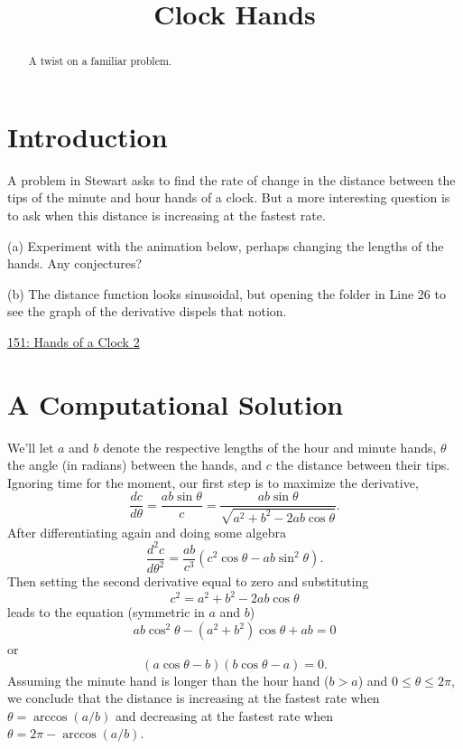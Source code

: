 \documentclass{ximera}
\title{Clock Hands}
\begin{document}
\begin{abstract}
A twist on a familiar problem.
\end{abstract}
\maketitle

\section*{Introduction}
A problem in Stewart asks to find the rate of change in the distance between the tips of the minute and hour hands of a clock. But a more interesting question is to ask when this distance is increasing at the fastest rate. 


\begin{exploration}
(a) Experiment with the animation below, perhaps changing the lengths of the hands. Any conjectures?

(b) The distance function looks sinusoidal, but opening the folder in Line 26 to see the graph of the derivative dispels that notion. 

\begin{onlineOnly}
    \begin{center}
\end{center}
\end{onlineOnly}

\href{https://www.desmos.com/calculator/pnpf5uhbre}{151: Hands of a Clock 2}


\end{exploration}

\section*{A Computational Solution}

We'll let $a$ and $b$ denote the respective lengths of the hour and minute hands, $\theta$ the angle (in radians) between the hands, and $c$ the distance between their tips. Ignoring time for the moment, our first step is to maximize the derivative,
\[
        \frac{dc}{d\theta} = \frac{ab\sin \theta}{c} = \frac{ab \sin \theta}{\sqrt{a^2+b^2-2ab\cos\theta}}.
\]
After differentiating again and doing some algebra 
\[
       \frac{d^2c}{d\theta^2} = \frac{ab}{c^3} \left( c^2\cos\theta - ab\sin^2\theta  \right).
\]
Then setting the second derivative equal to zero and substituting 
\[
      c^2 = a^2+b^2-2ab\cos\theta
\]
leads to the equation (symmetric in $a$ and $b$)
\[
     ab \cos^2\theta - (a^2 + b^2)\cos\theta + ab = 0
\]
or
\[
              (a \cos \theta - b) (b \cos \theta - a) = 0 .
\]
Assuming the minute hand is longer than the hour hand ($b>a$) and $0\leq \theta \leq 2\pi$, we conclude that the distance is increasing at the fastest rate when $\theta = \arccos(a/b)$ and decreasing at the fastest rate when $\theta  = 2\pi - \arccos(a/b)$.
\end{document}
